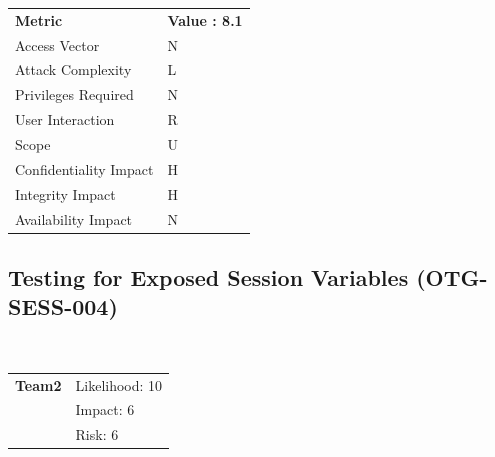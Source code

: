 \documentclass[headsepline,footsepline,footinclude=false,oneside,fontsize=11pt,paper=a4,listof=totoc,bibliography=totoc]{scrbook} %
\begin{document}
\begin{center}
	\begin{tabular}{ll}
		\rowcolor[HTML]{34CDF9}
		{\color[HTML]{ECF4FF} \textbf{Metric}}        & {\color[HTML]{ECF4FF} \textbf{Value : 8.1}} \\
		\rowcolor[HTML]{BBDAFF}
		{\color[HTML]{333333} Access Vector}          & {\color[HTML]{333333} } N             \\
		\rowcolor[HTML]{ECF4FF}
		{\color[HTML]{333333} Attack Complexity}      & {\color[HTML]{333333} } L              \\
		\rowcolor[HTML]{BBDAFF}
		{\color[HTML]{333333} Privileges Required}    & {\color[HTML]{333333} } N              \\
		\rowcolor[HTML]{ECF4FF}
		{\color[HTML]{333333} User Interaction}       & {\color[HTML]{333333} } R              \\
		\rowcolor[HTML]{BBDAFF}
		{\color[HTML]{333333} Scope}                  & {\color[HTML]{333333} } U              \\
		\rowcolor[HTML]{ECF4FF}
		{\color[HTML]{333333} Confidentiality Impact} & {\color[HTML]{333333} } H              \\
		\rowcolor[HTML]{BBDAFF}
		{\color[HTML]{333333} Integrity Impact}       & {\color[HTML]{333333} } H              \\
		\rowcolor[HTML]{ECF4FF}
		{\color[HTML]{333333} Availability Impact}    & {\color[HTML]{333333} } N
	\end{tabular}
\end{center}
\pagebreak
\subsection{Testing for Exposed Session Variables (OTG-SESS-004)}\

\begin{tabular}{cR{12cm}}
	\textbf{Team2} & Likelihood: 10\\& Impact: 6\\& Risk: 6
\end{tabular}
\end{document}
